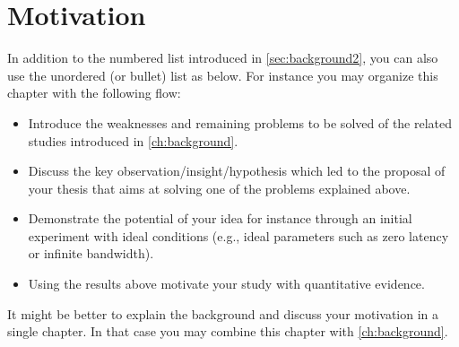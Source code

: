 \chapter{Motivation}\label{ch:motivation}

In addition to the numbered list introduced in \cref{sec:background2}, you can also use the unordered (or bullet) list as below.
For instance you may organize this chapter with the following flow:
\begin{itemize}
  \item Introduce the weaknesses and remaining problems to be solved of the related studies introduced in \cref{ch:background}.
  \item Discuss the key observation/insight/hypothesis which led to the proposal of your thesis that aims at solving one of the problems explained above.
  \item Demonstrate the potential of your idea for instance through an initial experiment with ideal conditions (e.g., ideal parameters such as zero latency or infinite bandwidth).
  \item Using the results above motivate your study with quantitative evidence.
\end{itemize}
It might be better to explain the background and discuss your motivation in a single chapter.
In that case you may combine this chapter with \cref{ch:background}.